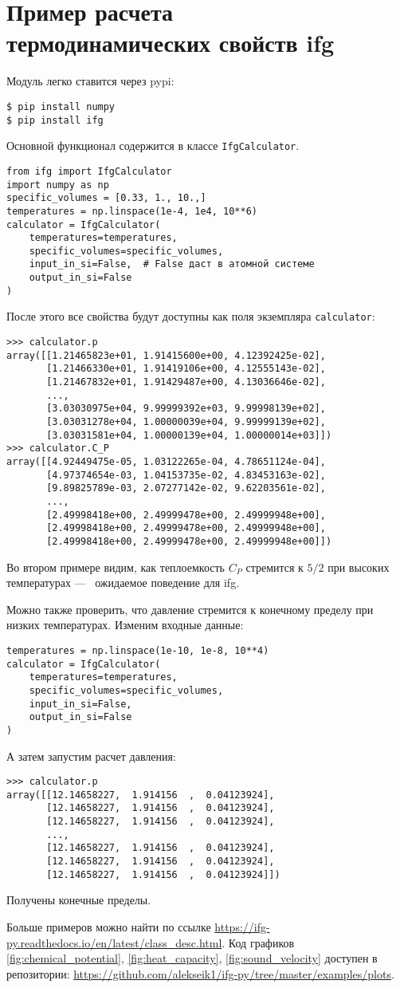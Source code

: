 
\chapter{Пример расчета\\ термодинамических свойств \texorpdfstring{\acrshort{ifg}}{ИФГ}}
Модуль легко ставится через \Gls{pypi}:
\begin{verbatim}
$ pip install numpy
$ pip install ifg
\end{verbatim}

Основной функционал содержится в классе \texttt{IfgCalculator}.
\begin{verbatim}
from ifg import IfgCalculator
import numpy as np
specific_volumes = [0.33, 1., 10.,]
temperatures = np.linspace(1e-4, 1e4, 10**6)
calculator = IfgCalculator(
    temperatures=temperatures,
    specific_volumes=specific_volumes,
    input_in_si=False,  # False даст в атомной системе
    output_in_si=False
)
\end{verbatim}
После этого все свойства будут доступны как поля экземпляра \texttt{calculator}:
\begin{verbatim}
>>> calculator.p
array([[1.21465823e+01, 1.91415600e+00, 4.12392425e-02],
       [1.21466330e+01, 1.91419106e+00, 4.12555143e-02],
       [1.21467832e+01, 1.91429487e+00, 4.13036646e-02],
       ...,
       [3.03030975e+04, 9.99999392e+03, 9.99998139e+02],
       [3.03031278e+04, 1.00000039e+04, 9.99999139e+02],
       [3.03031581e+04, 1.00000139e+04, 1.00000014e+03]])
>>> calculator.C_P
array([[4.92449475e-05, 1.03122265e-04, 4.78651124e-04],
       [4.97374654e-03, 1.04153735e-02, 4.83453163e-02],
       [9.89825789e-03, 2.07277142e-02, 9.62203561e-02],
       ...,
       [2.49998418e+00, 2.49999478e+00, 2.49999948e+00],
       [2.49998418e+00, 2.49999478e+00, 2.49999948e+00],
       [2.49998418e+00, 2.49999478e+00, 2.49999948e+00]])
\end{verbatim}
Во втором примере видим, как теплоемкость $C_P$ стремится к $5/2$ при высоких температурах ---~ ожидаемое поведение для \acrshort{ifg}.

Можно также проверить, что давление стремится к конечному пределу при низких температурах.
Изменим входные данные:
\begin{verbatim}
temperatures = np.linspace(1e-10, 1e-8, 10**4)
calculator = IfgCalculator(
    temperatures=temperatures,
    specific_volumes=specific_volumes,
    input_in_si=False,
    output_in_si=False
)
\end{verbatim}
А затем запустим расчет давления:
\begin{verbatim}
>>> calculator.p
array([[12.14658227,  1.914156  ,  0.04123924],
       [12.14658227,  1.914156  ,  0.04123924],
       [12.14658227,  1.914156  ,  0.04123924],
       ...,
       [12.14658227,  1.914156  ,  0.04123924],
       [12.14658227,  1.914156  ,  0.04123924],
       [12.14658227,  1.914156  ,  0.04123924]])
\end{verbatim}
Получены конечные пределы.

Больше примеров можно найти по ссылке \url{https://ifg-py.readthedocs.io/en/latest/class_desc.html}.
Код графиков \ref{fig:chemical_potential}, \ref{fig:heat_capacity}, \ref{fig:sound_velocity} доступен в репозитории: \url{https://github.com/alekseik1/ifg-py/tree/master/examples/plots}.
